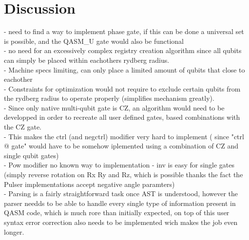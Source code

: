 \section{Discussion}
\label{Discussion}
- need to find a way to implement phase gate, if this can be done a universal set is possible, and the QASM\_U gate would also be functional \\
- no need for an excessively complex registry creation algorithm since all qubits can simply be placed within eachothers rydberg radius. \\
- Machine specs limiting, can only place a limited amount of qubits that close to eachother\\
- Constraints for optimization would not require to exclude certain qubits from the rydberg radius to operate properly (simplifies mechanism greatly).\\
- Since only native multi-qubit gate is CZ, an algorithm would need to be developped in order to recreate all user defined gates, based combinations with the CZ gate.\\
- This makes the ctrl (and negctrl) modifier very hard to implement ( since "ctrl @ gate" would have to be somehow iplemented using a combination of CZ and single qubit gates)\\
- Pow modifier no known way to implementation
- inv is easy for single gates (simply reverse rotation on Rx Ry and Rz, which is possible thanks the fact the Pulser implementations accept negative angle paramters)\\
- Parsing is a fairly straightforward task once AST is understood, however the parser needds to be able to handle every single type of information present in QASM code, which is much rore than initially expected, on top of this user syntax error correction also needs to be implemented wich makes the job even longer.
